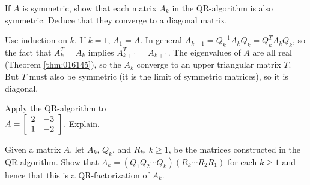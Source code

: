 \begin{multicols}{2}
\columnbreak

\begin{ex}
If $A$ is symmetric, show that each matrix $A_{k}$ in the QR-algorithm is also symmetric. Deduce that they converge to a diagonal matrix.

\begin{sol}
Use induction on $k$. If $k = 1$, $A_{1} = A$. In general $A_{k+1} = Q_{k}^{-1}A_{k}Q_{k} = Q_{k}^{T}A_{k}Q_{k}$, so the fact that $A_{k}^{T} = A_{k}$ implies $A_{k+1}^{T} = A_{k+1}$. The eigenvalues of $A$ are all real (Theorem \ref{thm:016145}), so the $A_{k}$ converge to an upper triangular matrix $T$. But $T$ must also be symmetric (it is the limit of symmetric matrices), so it is diagonal.
\end{sol}
\end{ex}

\begin{ex}
Apply the QR-algorithm to \\ $A = \left[ \begin{array}{rr}
2 & -3 \\
1 & -2
\end{array}\right]$. Explain.
\end{ex}

\begin{ex}
Given a matrix $A$, let $A_{k}$, $Q_{k}$, and $R_{k}$, $k \geq 1$, be the matrices constructed in the QR-algorithm. Show that $A_{k} = (Q_{1}Q_{2} \cdots Q_{k})(R_{k} \cdots R_{2}R_{1})$ for each $k \geq 1$ and hence that this is a QR-factorization of $A_{k}$. \newline [\textit{Hint}: Show that $Q_{k}R_{k} = R_{k-1}Q_{k-1}$ for each $k \geq 2$, and use this equality to compute $(Q_{1}Q_{2} \cdots Q_{k})(R_{k} \cdots R_{2}R_{1})$ ``from the centre out.'' Use the fact that $(AB)^{n+1} = A(BA)^{n}B$ for any square matrices $A$ and $B$.]
\end{ex}
\end{multicols}
